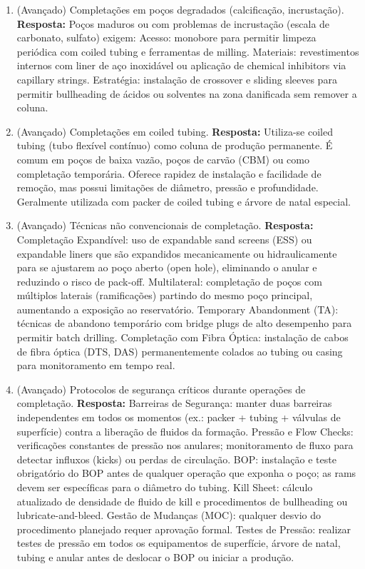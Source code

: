 \documentclass[11pt,a4paper]{article}
\begin{document}
\begin{enumerate}
  \item (Avançado) Completações em poços degradados (calcificação, incrustação).
  \textbf{Resposta:} Poços maduros ou com problemas de incrustação (escala de carbonato, sulfato) exigem: Acesso: monobore para permitir limpeza periódica com coiled tubing e ferramentas de milling. Materiais: revestimentos internos com liner de aço inoxidável ou aplicação de chemical inhibitors via capillary strings. Estratégia: instalação de crossover e sliding sleeves para permitir bullheading de ácidos ou solventes na zona danificada sem remover a coluna.

  \item (Avançado) Completações em coiled tubing.
  \textbf{Resposta:} Utiliza-se coiled tubing (tubo flexível contínuo) como coluna de produção permanente. É comum em poços de baixa vazão, poços de carvão (CBM) ou como completação temporária. Oferece rapidez de instalação e facilidade de remoção, mas possui limitações de diâmetro, pressão e profundidade. Geralmente utilizada com packer de coiled tubing e árvore de natal especial.

  \item (Avançado) Técnicas não convencionais de completação.
  \textbf{Resposta:} Completação Expandível: uso de expandable sand screens (ESS) ou expandable liners que são expandidos mecanicamente ou hidraulicamente para se ajustarem ao poço aberto (open hole), eliminando o anular e reduzindo o risco de pack-off. Multilateral: completação de poços com múltiplos laterais (ramificações) partindo do mesmo poço principal, aumentando a exposição ao reservatório. Temporary Abandonment (TA): técnicas de abandono temporário com bridge plugs de alto desempenho para permitir batch drilling. Completação com Fibra Óptica: instalação de cabos de fibra óptica (DTS, DAS) permanentemente colados ao tubing ou casing para monitoramento em tempo real.

  \item (Avançado) Protocolos de segurança críticos durante operações de completação.
  \textbf{Resposta:} Barreiras de Segurança: manter duas barreiras independentes em todos os momentos (ex.: packer + tubing + válvulas de superfície) contra a liberação de fluidos da formação. Pressão e Flow Checks: verificações constantes de pressão nos anulares; monitoramento de fluxo para detectar influxos (kicks) ou perdas de circulação. BOP: instalação e teste obrigatório do BOP antes de qualquer operação que exponha o poço; as rams devem ser específicas para o diâmetro do tubing. Kill Sheet: cálculo atualizado de densidade de fluido de kill e procedimentos de bullheading ou lubricate-and-bleed. Gestão de Mudanças (MOC): qualquer desvio do procedimento planejado requer aprovação formal. Testes de Pressão: realizar testes de pressão em todos os equipamentos de superfície, árvore de natal, tubing e anular antes de deslocar o BOP ou iniciar a produção.
\end{enumerate}
\end{document}
